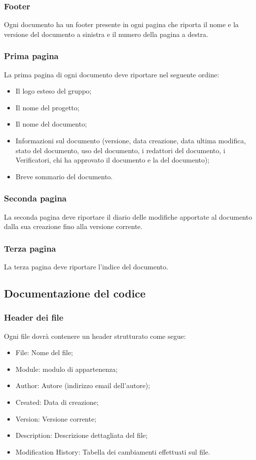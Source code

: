 \subsubsection{Footer}
\label{5.2.2}
Ogni documento ha un footer presente in ogni pagina che riporta il nome e la versione del documento a sinistra e il numero della pagina a destra.

\subsubsection{Prima pagina}
\label{5.2.3}
La prima pagina di ogni documento deve riportare nel seguente ordine:
\begin{itemize}
\item Il logo esteso del gruppo;
\item Il nome del progetto;
\item Il nome del documento;
\item Informazioni sul documento (versione, data creazione, data ultima modifica, stato del documento, uso del documento, i redattori del documento, i Verificatori, chi ha approvato il documento e la  del documento);
\item Breve sommario del documento.
\end{itemize}

\subsubsection{Seconda pagina}
\label{5.2.4}
La seconda pagina deve riportare il diario delle modifiche apportate al documento dalla sua creazione fino alla versione corrente.

\subsubsection{Terza pagina}
\label{5.2.5}
La terza pagina deve riportare l'indice del documento.

\subsection{Documentazione del codice}
\label{5.3}

\subsubsection{Header dei file}
\label{5.3.1}
Ogni file dovrà contenere un header strutturato come segue:
\begin{itemize}
\item File: Nome del file;
\item Module: modulo di appartenenza;
\item Author: Autore (indirizzo email dell'autore);
\item Created: Data di creazione;
\item Version: Versione corrente;
\item Description: Descrizione dettagliata del file;
\item Modification History: Tabella dei cambiamenti effettuati sul file.
\end{itemize}


